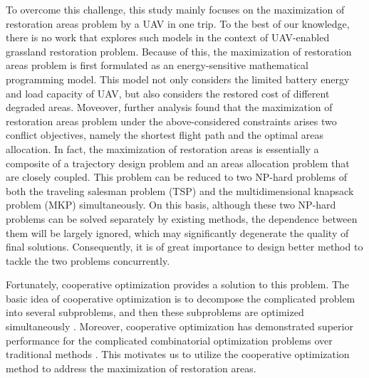 \documentclass[preprint,5pt]{elsarticle}
\begin{document}
To overcome this challenge, this study mainly focuses on the maximization of restoration areas problem by a UAV in one trip.
To the best of our knowledge, there is no work that explores such models in the context of UAV-enabled grassland restoration problem. Because of this, the maximization of restoration areas problem is first formulated as an energy-sensitive mathematical programming model. This model not only considers the limited battery energy and load capacity of UAV, but also considers the restored cost of different degraded areas. Moveover, further analysis found that the maximization of restoration areas problem under the above-considered constraints arises two conflict objectives, namely the shortest flight path and the optimal areas allocation. In fact, the maximization of restoration areas is essentially a composite of a trajectory design problem and an areas allocation problem that are closely coupled. This problem can be reduced to two NP-hard problems of both the traveling salesman problem (TSP) and the multidimensional knapsack problem (MKP) simultaneously. On this basis, although these two NP-hard problems can be solved separately by existing methods, the dependence between them will be largely ignored, which may significantly degenerate the quality of final solutions. Consequently, it is of great importance to design better method to tackle the two problems concurrently.

Fortunately, cooperative optimization provides a solution to this problem. The basic idea of cooperative optimization is to decompose the complicated problem into several subproblems, and then these subproblems are optimized simultaneously \cite{huang2004cooperative}. Moreover, cooperative optimization has demonstrated superior performance for the complicated combinatorial optimization problems over traditional methods \cite{huang2004cooperative,renzi2014review}. This motivates us to utilize the cooperative optimization method to address the maximization of restoration areas.
\end{document}
